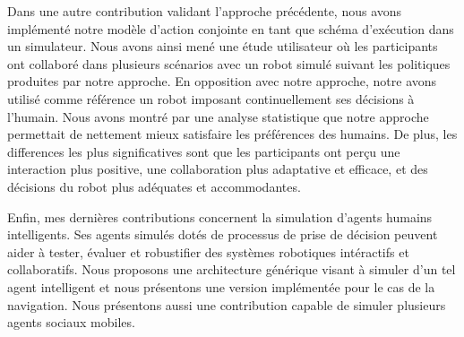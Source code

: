 Dans une autre contribution validant l'approche précédente, nous avons implémenté notre modèle d'action conjointe en tant que schéma d'exécution dans un simulateur. Nous avons ainsi mené une étude utilisateur où les participants ont collaboré dans plusieurs scénarios avec un robot simulé suivant les politiques produites par notre approche. En opposition avec notre approche, notre avons utilisé comme référence un robot imposant continuellement ses décisions à l'humain. Nous avons montré par une analyse statistique que notre approche permettait de nettement mieux satisfaire les préférences des humains. De plus, les differences les plus significatives sont que les participants ont perçu une interaction plus positive, une collaboration plus adaptative et efficace, et des décisions du robot plus adéquates et accommodantes.   

Enfin, mes dernières contributions concernent la simulation d'agents humains intelligents. Ses agents simulés dotés de processus de prise de décision peuvent aider à tester, évaluer et robustifier des systèmes robotiques intéractifs et collaboratifs. Nous proposons une architecture générique visant à simuler d'un tel agent intelligent et nous présentons une version implémentée pour le cas de la navigation. Nous présentons aussi une contribution capable de simuler plusieurs agents sociaux mobiles.